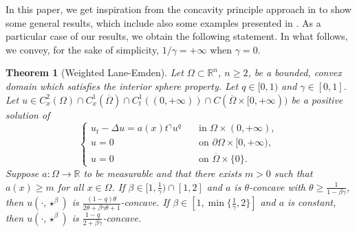 \documentclass[11pt, reqno]{amsart}
\newtheorem{theorem}[lemma]{Theorem}
\theoremstyle{definition}
\newtheorem{definition}[lemma]{Definition}
\numberwithin{equation}{section}
\newcommand{\Omegabar}{\overline{\Omega}}
\newcommand{\R}{\mathbb{R}}
\newcommand{\tr}[1]{{\color{red} #1}}
\newcommand{\tb}[1]{{\color{blue} #1}}
\begin{document}
In this paper, we get inspiration from the concavity principle approach in \cite{kenningtonparabolic} to show some general results, which include also some examples presented in \cite{IsSa13, IsSa16}. 
As a particular case of our results, we obtain the following statement. 
%
In what follows, we convey, for the sake of simplicity, $1/\gamma=+\infty$ when $\gamma=0$.
\begin{theorem}[Weighted Lane-Emden]
\label{thm_main_weighted_le}
	Let $\Omega \subset \R^n$, $n\geq 2$, be a bounded, convex domain which satisfies the interior sphere property.
	 Let $q \in [0,1)$ and $\gamma \in [0,1]$. 
	Let $u\in C^2_x(\Omega)\cap C^1_x(\Omegabar) \cap C^1_t((0,+\infty)) \cap C(\Omegabar\times[0,+\infty))$ be a positive solution of 
$$		
\begin{cases}
u_t-\Delta u=a(x) t^{\gamma} u^q &\quad\text{in }\Omega\times (0,+\infty), \\
u=0 & \quad\text{on }\partial \Omega\times [0,+\infty),	 \\
u =0 & \quad \text{on } \Omegabar \times \{0\}.
\end{cases}
$$
Suppose $a\colon \Omega \to \R$ to be measurable and that there exists $m>0$ such that $a(x)\geq m$ for all $x\in \Omega$. 
If $\beta \in [1, \frac{1}{\gamma}) \cap [1,2]$ and $a$ is $\theta$-concave with $\theta \geq \frac{1}{1-\beta \gamma}$, then $u(\cdot, \star^{\beta})$ is $\frac{(1-q)\theta}{2\theta +\beta \gamma \theta+1}$-concave. 
If $\beta \in [1, \min\{\frac{1}{\gamma},2\}]$ and $a$ is constant, then $u(\cdot, \star^{\beta})$ is $\frac{1-q}{2+\beta \gamma }$-concave.
\end{theorem}
\end{document}
